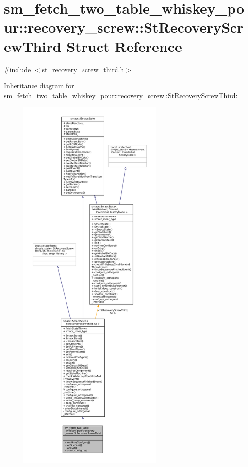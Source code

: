 \hypertarget{structsm__fetch__two__table__whiskey__pour_1_1recovery__screw_1_1StRecoveryScrewThird}{}\section{sm\+\_\+fetch\+\_\+two\+\_\+table\+\_\+whiskey\+\_\+pour\+:\+:recovery\+\_\+screw\+:\+:St\+Recovery\+Screw\+Third Struct Reference}
\label{structsm__fetch__two__table__whiskey__pour_1_1recovery__screw_1_1StRecoveryScrewThird}


{\ttfamily \#include $<$st\+\_\+recovery\+\_\+screw\+\_\+third.\+h$>$}



Inheritance diagram for sm\+\_\+fetch\+\_\+two\+\_\+table\+\_\+whiskey\+\_\+pour\+:\+:recovery\+\_\+screw\+:\+:St\+Recovery\+Screw\+Third\+:
\nopagebreak
\begin{figure}[H]
\begin{center}
\leavevmode
\includegraphics[height=550pt]{structsm__fetch__two__table__whiskey__pour_1_1recovery__screw_1_1StRecoveryScrewThird__inherit__graph}
\end{center}
\end{figure}


